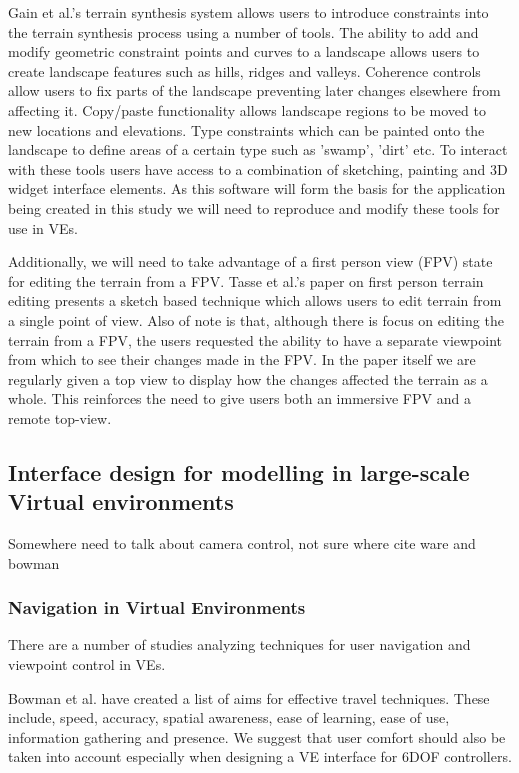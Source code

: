 \documentclass{sig-alternate-05-2015}
\begin{document}
 Gain et al.'s terrain synthesis system allows users to introduce constraints into the terrain synthesis process using a number of tools\cite{Gain2015}. The ability to add and modify geometric constraint points and curves to a landscape allows users to create landscape features such as hills, ridges and valleys.  Coherence controls allow users to fix parts of the landscape preventing later changes elsewhere from affecting it. Copy/paste functionality allows landscape regions to be moved to new locations and elevations. Type constraints which can be painted onto the landscape to define areas of a certain type such as 'swamp', 'dirt' etc. To interact with these tools users have access to a combination of sketching, painting and 3D widget interface elements. As this software will form the basis for the application being created in this study we will need to reproduce and modify these tools for use in VEs.

Additionally, we will need to take advantage of a first person view (FPV) state for editing the terrain from a FPV. Tasse et al.'s paper on first person terrain editing presents a sketch based technique which allows users to  edit terrain from a single point of view\cite{Tasse2014}. Also of note is that, although there is focus on editing the terrain from a FPV, the users requested the ability to have a separate viewpoint from which to see their changes made in the FPV. In the paper itself we are regularly given a top view to display how the changes affected the terrain as a whole. This reinforces the need to give users both an immersive FPV and a remote top-view.
\subsection{Interface design for modelling in large-scale Virtual environments}
Somewhere need to talk about camera control, not sure where cite ware and bowman
\subsubsection{Navigation in Virtual Environments}
There are a number of studies analyzing techniques for user navigation and viewpoint control in VEs.

Bowman et al. have created a list of aims for effective travel techniques.\cite{Bowman1997} These include, speed, accuracy, spatial awareness, ease of learning, ease of use, information gathering and presence. We suggest that user comfort should also be taken into account especially when designing a VE interface for 6DOF controllers.
\end{document}
